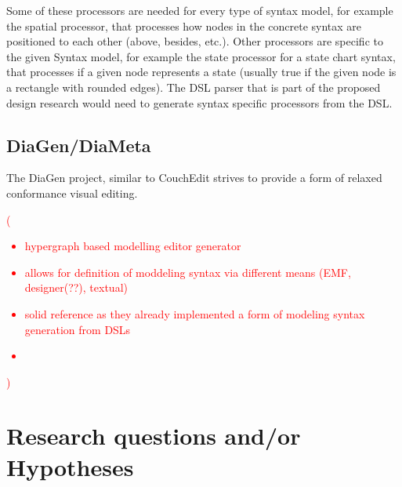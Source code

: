 \documentclass[10pt,a4paper,oneside]{scrartcl}
\newcommand\comment[1]{\textcolor{red}{(#1)}}
\begin{document}
Some of these processors are needed for every type of syntax model, for example the spatial processor, that processes how nodes in the concrete syntax are positioned to each other (above, besides, etc.). Other processors are specific to the given Syntax model, for example the state processor for a state chart syntax, that processes if a given node represents a state (usually true if the given node is a rectangle with rounded edges). The DSL parser that is part of the proposed design research would need to generate syntax specific processors from the DSL. 


\subsection{DiaGen/DiaMeta}
\label{DiaGen/DiaMeta}

The DiaGen project, similar to CouchEdit strives to provide a form of relaxed conformance visual editing. 

\comment{
  \begin{itemize}
    \item hypergraph based modelling editor generator
    \item allows for definition of moddeling syntax via different means (EMF, designer(??), textual)
    \item solid reference as they already implemented a form of modeling syntax generation from DSLs
    \item 
  \end{itemize}
}

\section{Research questions and/or Hypotheses}
\label{sub:questions}
\end{document}
